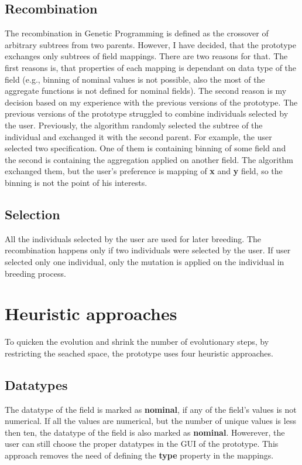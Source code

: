   \subsection{Recombination}
  The recombination in Genetic Programming is defined as the crossover of arbitrary subtrees from two parents. However, I have decided, that the prototype exchanges only subtrees of field mappings. There are two reasons for that. The first reasons is, that properties of each mapping is dependant on data type of the field (e.g., binning of nominal values is not possible, also the most of the aggregate functions is not defined for nominal fields). The second reason is my decision based on my experience with the previous versions of the prototype. The previous versions of the prototype struggled to combine individuals selected by the user. Previously, the algorithm randomly selected the subtree of the individual and exchanged it with the second parent. For example, the user selected two specification. One of them is containing binning of some field and the second is containing the aggregation applied on another field. The algorithm exchanged them, but the user's preference is mapping of \textbf{x} and \textbf{y} field, so the binning is not the point of his interests.
  \subsection{Selection}
  All the individuals selected by the user are used for later breeding. The recombination happens only if two individuals were selected by the user. If user selected only one individual, only the mutation is applied on the individual in breeding process.



\section{Heuristic approaches}
  To quicken the evolution and shrink the number of evolutionary steps, by restricting the seached space, the prototype uses four heuristic approaches.
  \subsection{Datatypes}
  The datatype of the field is marked as \textbf{nominal}, if any of the field's values is not numerical. If all the values are numerical, but the number of unique values is less then ten, the datatype of the field is also marked as \textbf{nominal}. Howerever, the user can still choose the proper datatypes in the GUI of the prototype. This approach removes the need of defining the \textbf{type} property in the mappings.
